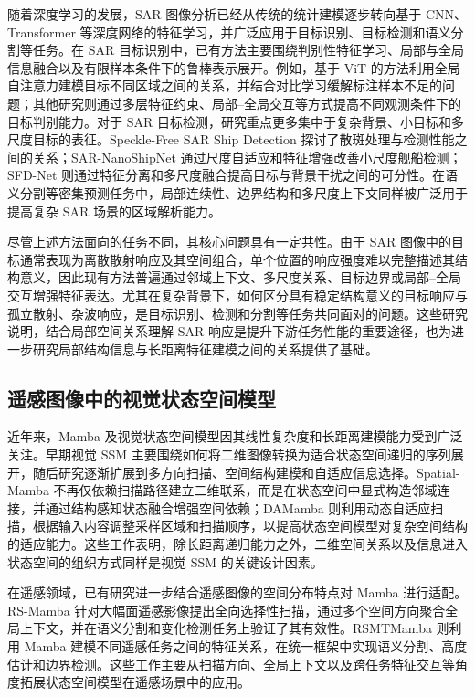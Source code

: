 \documentclass[journal]{IEEEtran}
\begin{document}
随着深度学习的发展，SAR 图像分析已经从传统的统计建模逐步转向基于 CNN、Transformer 等深度网络的特征学习，并广泛应用于目标识别、目标检测和语义分割等任务。在 SAR 目标识别中，已有方法主要围绕判别性特征学习、局部与全局信息融合以及有限样本条件下的鲁棒表示展开。例如，基于 ViT 的方法利用全局自注意力建模目标不同区域之间的关系，并结合对比学习缓解标注样本不足的问题；其他研究则通过多层特征约束、局部--全局交互等方式提高不同观测条件下的目标判别能力。对于 SAR 目标检测，研究重点更多集中于复杂背景、小目标和多尺度目标的表征。Speckle-Free SAR Ship Detection 探讨了散斑处理与检测性能之间的关系\cite{specklefree}；SAR-NanoShipNet 通过尺度自适应和特征增强改善小尺度舰船检测\cite{sarnano}；SFD-Net 则通过特征分离和多尺度融合提高目标与背景干扰之间的可分性\cite{sfdnet}。在语义分割等密集预测任务中，局部连续性、边界结构和多尺度上下文同样被广泛用于提高复杂 SAR 场景的区域解析能力\cite{fusar}。

尽管上述方法面向的任务不同，其核心问题具有一定共性。由于 SAR 图像中的目标通常表现为离散散射响应及其空间组合，单个位置的响应强度难以完整描述其结构意义，因此现有方法普遍通过邻域上下文、多尺度关系、目标边界或局部--全局交互增强特征表达。尤其在复杂背景下，如何区分具有稳定结构意义的目标响应与孤立散射、杂波响应，是目标识别、检测和分割等任务共同面对的问题。这些研究说明，结合局部空间关系理解 SAR 响应是提升下游任务性能的重要途径，也为进一步研究局部结构信息与长距离特征建模之间的关系提供了基础。


\subsection{遥感图像中的视觉状态空间模型}

近年来，Mamba 及视觉状态空间模型因其线性复杂度和长距离建模能力受到广泛关注。早期视觉 SSM 主要围绕如何将二维图像转换为适合状态空间递归的序列展开，随后研究逐渐扩展到多方向扫描、空间结构建模和自适应信息选择。Spatial-Mamba 不再仅依赖扫描路径建立二维联系，而是在状态空间中显式构造邻域连接，并通过结构感知状态融合增强空间依赖\cite{spatialmamba2025}；DAMamba 则利用动态自适应扫描，根据输入内容调整采样区域和扫描顺序，以提高状态空间模型对复杂空间结构的适应能力\cite{damamba2025}。这些工作表明，除长距离递归能力之外，二维空间关系以及信息进入状态空间的组织方式同样是视觉 SSM 的关键设计因素。

在遥感领域，已有研究进一步结合遥感图像的空间分布特点对 Mamba 进行适配。RS-Mamba 针对大幅面遥感影像提出全向选择性扫描，通过多个空间方向聚合全局上下文，并在语义分割和变化检测任务上验证了其有效性\cite{rsmamba2024}。RSMTMamba 则利用 Mamba 建模不同遥感任务之间的特征关系，在统一框架中实现语义分割、高度估计和边界检测\cite{rstmtmamba2025}。这些工作主要从扫描方向、全局上下文以及跨任务特征交互等角度拓展状态空间模型在遥感场景中的应用。
\end{document}

